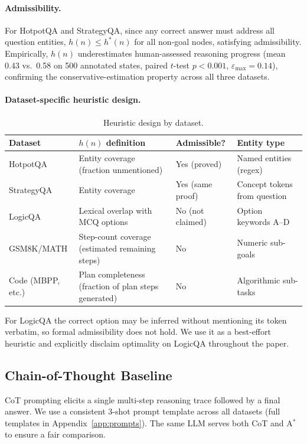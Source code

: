 \documentclass{article}
\newcommand{\astar}{A$^*$\xspace}
\begin{document}
\paragraph{Admissibility.}
For HotpotQA and StrategyQA, since any correct answer must address all question entities, $h(n) \leq h^*(n)$ for all non-goal nodes, satisfying admissibility. Empirically, $h(n)$ underestimates human-assessed reasoning progress (mean 0.43 vs.\ 0.58 on 500 annotated states, paired $t$-test $p < 0.001$, $\varepsilon_{\max}=0.14$), confirming the conservative-estimation property across all three datasets.

\paragraph{Dataset-specific heuristic design.}
\begin{table}[h]
\centering
\caption{Heuristic design by dataset.}
\label{tab:heuristic_design}
\small
\begin{tabular}{llll}
\toprule
Dataset & $h(n)$ definition & Admissible? & Entity type \\
\midrule
HotpotQA   & Entity coverage (fraction unmentioned) & Yes (proved) & Named entities (regex) \\
StrategyQA & Entity coverage & Yes (same proof) & Concept tokens from question \\
LogicQA    & Lexical overlap with MCQ options & No (not claimed) & Option keywords A--D \\
GSM8K/MATH & Step-count coverage (estimated remaining steps) & No & Numeric sub-goals \\
Code (MBPP, etc.) & Plan completeness (fraction of plan steps generated) & No & Algorithmic sub-tasks \\
\bottomrule
\end{tabular}
\end{table}
For LogicQA the correct option may be inferred without mentioning its token verbatim, so formal admissibility does not hold. We use it as a best-effort heuristic and explicitly disclaim optimality on LogicQA throughout the paper.

\subsection{Chain-of-Thought Baseline}
\label{sec:cot}

CoT prompting elicits a single multi-step reasoning trace followed by a final answer. We use a consistent 3-shot prompt template across all datasets (full templates in Appendix~\ref{app:prompts}). The same LLM serves both CoT and \astar to ensure a fair comparison.
\end{document}
